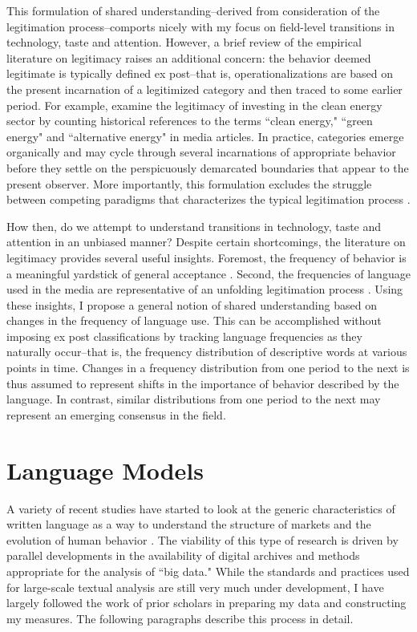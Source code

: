 This formulation of shared understanding--derived from consideration of the legitimation process--comports nicely with my focus on field-level transitions in technology, taste and attention. However, a brief review of the empirical literature on legitimacy raises an additional concern: the behavior deemed legitimate is typically defined ex post--that is, operationalizations are based on the present incarnation of a legitimized category and then traced to some earlier period. For example, \citet{petkova2014} examine the legitimacy of investing in the clean energy sector by counting historical references to the terms ``clean energy," ``green energy" and ``alternative energy" in media articles. In practice, categories emerge organically \citep{goldberg2012} and may cycle through several incarnations of appropriate behavior before they settle on the perspicuously demarcated boundaries that appear to the present observer. More importantly, this formulation excludes the struggle between competing paradigms that characterizes the typical legitimation process \citep{colyvas2007, powell2008}.

How then, do we attempt to understand transitions in technology, taste and attention in an unbiased manner? Despite certain shortcomings, the literature on legitimacy provides several useful insights. Foremost, the frequency of  behavior is a meaningful yardstick of general acceptance \citep{hannan1992}. Second, the frequencies of language used in the media are representative of an unfolding legitimation process \citep{petkova2014, rosa1999}. Using these insights, I propose a general notion of shared understanding based on changes in the frequency of language use. This can be accomplished without imposing ex post classifications by tracking language frequencies as they naturally occur--that is, the frequency distribution of descriptive words at various points in time. Changes in a frequency distribution from one period to the next is thus assumed to represent shifts in the importance of behavior described by the language. In contrast, similar distributions from one period to the next may represent an emerging consensus in the field. 

\section{Language Models}

A variety of recent studies have started to look at the generic characteristics of written language as a way to understand the structure of markets and the evolution of human behavior \citep{klingenstein2014, goldberg2012, tirunillai2014}. The viability of this type of research is driven by parallel developments in the availability of digital archives and methods appropriate for the analysis of ``big data." While the standards and practices used for large-scale textual analysis are still very much under development, I have largely followed the work of prior scholars in preparing my data and constructing my measures. The following paragraphs describe this process in detail.

